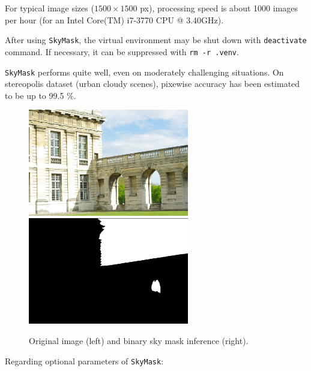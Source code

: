 \noindent For typical image sizes ($1500 \times 1500$ px), processing speed is about 1000 images per hour (for an Intel Core(TM) i7-3770 CPU @ 3.40GHz). \newline

\noindent After using \texttt{SkyMask}, the virtual environment may be shut down with \texttt{deactivate} command. If necessary, it can be suppressed with \texttt{rm -r .venv}. \newline

\noindent \texttt{SkyMask} performs quite well, even on moderately challenging situations. On stereopolis dataset (urban cloudy scenes), pixewise accuracy has been estimated to be up to 99.5 \%. \newline

\begin{figure}[!h]
	\begin{center}
		\includegraphics[width=70mm]{FIGS/SkyMask/im2.JPG}
		\hspace{0.2cm}
		\includegraphics[width=70mm]{FIGS/SkyMask/mask2.JPG}
		\caption{Original image (left) and binary sky mask inference (right).}
	\end{center}	
\end{figure}

\noindent Regarding optional parameters of \texttt{SkyMask}: \newline

